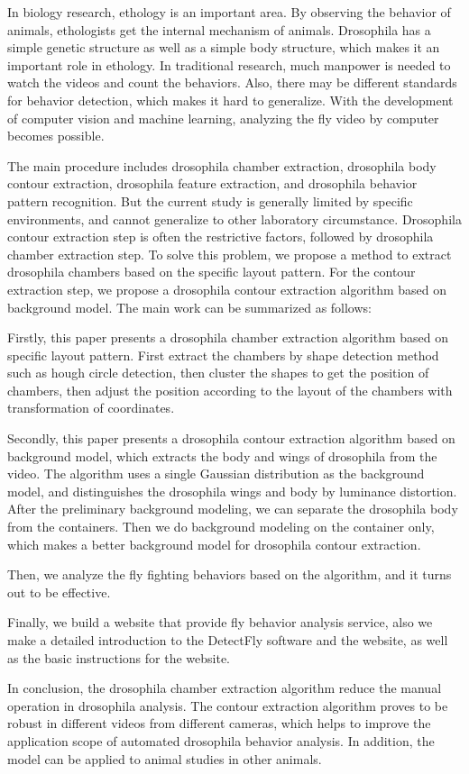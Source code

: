 \begin{eabstract}

In biology research, ethology is an important area. By observing the behavior of animals, ethologists get the internal mechanism of animals. Drosophila has a simple genetic structure as well as a simple body structure, which makes it an important role in ethology. In traditional research, much manpower is needed to watch the videos and count the behaviors. Also, there may be different standards for behavior detection, which makes it hard to generalize. With the development of computer vision and machine learning, analyzing the fly video by computer becomes possible.

The main procedure includes drosophila chamber extraction, drosophila body contour extraction, drosophila feature extraction, and drosophila behavior pattern recognition. But the current study is generally limited by specific environments, and cannot generalize to other laboratory circumstance. Drosophila contour extraction step is often the restrictive factors, followed by drosophila chamber extraction step. To solve this problem, we propose a method to extract drosophila chambers based on the specific layout pattern. For the contour extraction step, we propose a drosophila contour extraction algorithm based on background model. The main work can be summarized as follows:

Firstly, this paper presents a drosophila chamber extraction algorithm based on specific layout pattern. First extract the chambers by shape detection method such as hough circle detection, then cluster the shapes to get the position of chambers, then adjust the position according to the layout of the chambers with transformation of coordinates.

Secondly, this paper presents a drosophila contour extraction algorithm based on background model, which extracts the body and wings of drosophila from the video. The algorithm uses a single Gaussian distribution as the background model, and distinguishes the drosophila wings and body by luminance distortion. After the preliminary background modeling, we can separate the drosophila body from the containers. Then we do background modeling on the container only, which makes a better background model for drosophila contour extraction.

Then, we analyze the fly fighting behaviors based on the algorithm, and it turns out to be effective.

Finally, we build a website that provide fly behavior analysis service, also we make a detailed introduction to the DetectFly software and the website, as well as the basic instructions for the website.

In conclusion, the drosophila chamber extraction algorithm reduce the manual operation in drosophila analysis. The contour extraction algorithm proves to be robust in different videos from different cameras, which helps to improve the application scope of  automated drosophila behavior analysis. In addition, the model can be applied to animal studies in other animals.

\end{eabstract}

